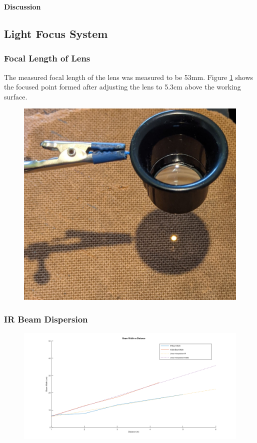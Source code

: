 \textbf{Discussion}\\







\subsection{Light Focus System}

\subsubsection{Focal Length of Lens}

The measured focal length of the lens was measured to be 53mm. Figure \ref{fig:focal_length_experiemnt_result} shows the focused point formed after adjusting the lens to 5.3cm above the working surface.

\begin{figure}[H]
	\centering
	\includegraphics[width=.6\linewidth]{figures/results/focal_length_result.jpg}
	\label{fig:focal_length_experiemnt_result}
\end{figure}


\subsubsection{IR Beam Dispersion}

\begin{figure}[H]
	\centering
	\includegraphics[width=\linewidth]{figures/results/beam_width_vs_distance.png}
	\label{fig:beam_width_vs_distance}
\end{figure}



